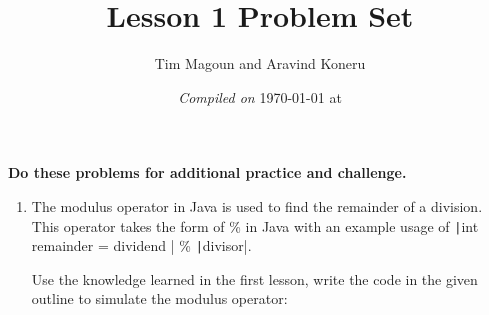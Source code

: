 \documentclass[11pt,fleqn]{article}
\newcommand{\mil}[2][java]{\texttt|#2|}
\begin{document}
\title{Lesson 1 Problem Set}%
\author{Tim Magoun and Aravind Koneru}
\date{\textit{Compiled on} \today \hspace{1mm} at \currenttime}
\maketitle

\begin{center}
\textbf{Do these problems for additional practice and challenge.}
\end{center}

\begin{enumerate}
\item The modulus operator in Java is used to find the remainder of a division. This operator takes the form of \% in Java with an example usage of \mil{int remainder = dividend } \% \mil{divisor}.

Use the knowledge learned in the first lesson, write the code in the given outline to simulate the modulus operator:
\inputminted{java}{../src/Modulus.java}

\end{enumerate}
\end{document}
